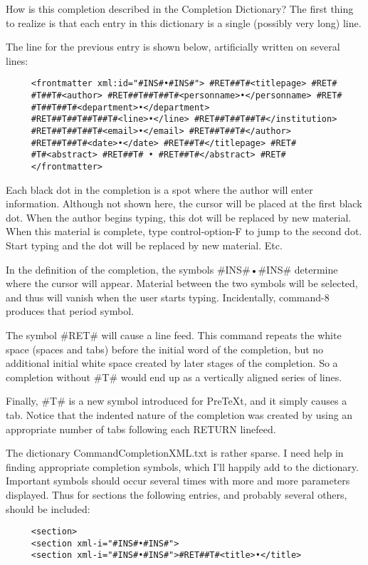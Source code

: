 \documentclass[11pt, oneside]{article}   	%
\begin{document}
How is this completion described in the Completion Dictionary? The first thing to realize is that each entry in this dictionary is a single (possibly very long) line.

The line for the previous entry is shown below, artificially written on several lines:
\begin{verbatim}
     <frontmatter xml:id="#INS#•#INS#"> #RET##T#<titlepage> #RET#
     #T##T#<author> #RET##T##T##T#<personname>•</personname> #RET#
     #T##T##T#<department>•</department>
     #RET##T##T##T##T#<line>•</line> #RET##T##T##T#</institution> 
     #RET##T##T##T#<email>•</email> #RET##T##T#</author> 
     #RET##T##T#<date>•</date> #RET##T#</titlepage> #RET#
     #T#<abstract> #RET##T# • #RET##T#</abstract> #RET#
     </frontmatter>
\end{verbatim}

Each black dot in the completion is a spot where the author will enter information. Although not shown here, the cursor will be placed at the first black dot. When the author begins typing, this dot will be replaced by new material. When this material is complete,  type control-option-F to jump to the second dot. Start typing and the dot will be replaced by  new material. Etc.

In the definition of the completion, the symbols \#INS\#•\#INS\# determine where the cursor will appear. Material between the two symbols will be selected, and thus will vanish when the user starts typing. Incidentally, command-8 produces that period symbol.

The symbol \#RET\# will cause a line feed. This command repeats the white space (spaces and tabs) before the initial word of the completion, but no additional initial white space created by later stages of the completion.
So a completion without \#T\# would end up as a vertically aligned series of lines.

Finally, \#T\# is a new symbol introduced for PreTeXt, and it simply causes a tab. Notice that the indented nature of the completion was created by using an appropriate number of tabs following each RETURN linefeed.

The dictionary CommandCompletionXML.txt is rather sparse. I need help in finding appropriate completion symbols, which I'll happily add to the dictionary. Important symbols should occur several times with more and more parameters displayed. Thus for sections the following entries, and probably several others, should be included:
\begin{verbatim}
     <section>
     <section xml-i="#INS#•#INS#">
     <section xml-i="#INS#•#INS#">#RET##T#<title>•</title>
\end{verbatim}
\end{document}
